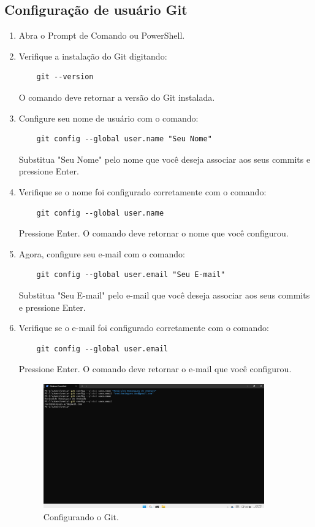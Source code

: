 \subsection{Configuração de usuário Git}
\begin{enumerate}
  \item Abra o Prompt de Comando ou PowerShell.
  \item Verifique a instalação do Git digitando:
  \begin{verbatim}
    git --version
  \end{verbatim}
  O comando deve retornar a versão do Git instalada.
  \item Configure seu nome de usuário com o comando:
  \begin{verbatim}
    git config --global user.name "Seu Nome"
  \end{verbatim}
  Substitua "Seu Nome" pelo nome que você deseja associar aos seus commits e pressione Enter.
  \item Verifique se o nome foi configurado corretamente com o comando:
  \begin{verbatim}
    git config --global user.name
  \end{verbatim}
  Pressione Enter.
  O comando deve retornar o nome que você configurou.
  \item Agora, configure seu e-mail com o comando:
  \begin{verbatim}
    git config --global user.email "Seu E-mail"
  \end{verbatim}
  Substitua "Seu E-mail" pelo e-mail que você deseja associar aos seus commits e pressione Enter.
  \item Verifique se o e-mail foi configurado corretamente com o comando:
  \begin{verbatim}
    git config --global user.email
  \end{verbatim}
  Pressione Enter.
  O comando deve retornar o e-mail que você configurou.
  \begin{figure}[H]
    \centering
    \includegraphics[width=0.9\textwidth]{./assets/images/14_git_base_config.png}
    \caption{Configurando o Git.}
    \label{fig:git_base_config}
  \end{figure}
\end{enumerate}
\par
